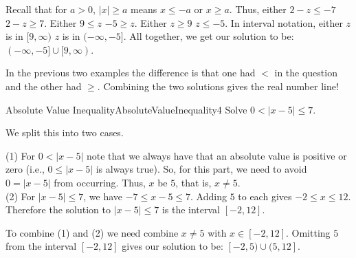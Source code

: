 \begin{solution} 
Recall that for $a>0$, $|x|\geq a$ means $x\leq -a$ or $x\geq a$.
Thus, either $2-z\leq -7$  $2-z\geq 7$.
Either $9\leq z$  $-5 \geq z$.
Either $z\geq 9$  $z \leq -5$.
In interval notation, either $z$ is in $[9,\infty)$  $z$ is in $(-\infty,-5]$.
All together, we get our solution to be: $(-\infty,-5]\cup [9,\infty)$.
\end{solution}

In the previous two examples the  difference is that one had $<$ in 
the question and the other had $\geq$. Combining the two solutions gives the 
 real number line! \\

\begin{example}{Absolute Value Inequality}{AbsoluteValueInequality4}
Solve $0<|x-5|\leq 7$.
\end{example}

\begin{solution} 
We split this into two cases.

(1) For $0<|x-5|$ note that we always have that an absolute value is positive or zero (i.e., $0\leq |x-5|$ is always true).
So, for this part, we need to avoid $0=|x-5|$ from occurring. 
Thus, $x$  be $5$, that is, $x\neq 5$.\\

(2) For $|x-5|\leq 7$, we have $-7\leq x-5\leq 7$.
Adding $5$ to each gives $-2\leq x\leq 12$.
Therefore the solution to $|x-5|\leq 7$ is the interval $[-2,12]$.

To combine (1) and (2) we need combine $x\neq 5$ with $x\in[-2,12]$.
Omitting $5$ from the interval $[-2,12]$ gives our solution to be: $[-2,5)\cup(5,12]$.
\end{solution}
